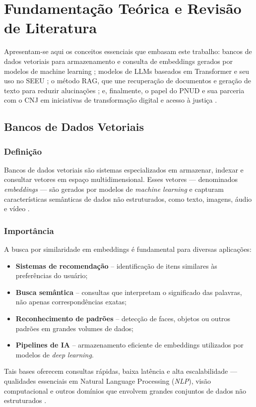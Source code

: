 

\chapter{Fundamentação Teórica e Revisão de Literatura}
\label{chap:fundamentacao_literatura}

Apresentam-se aqui os conceitos essenciais que embasam este trabalho: bancos de dados vetoriais para armazenamento e consulta de embeddings gerados por modelos de machine learning \cite{qwak2024integrating}; modelos de LLMs baseados em Transformer e seu uso no SEEU \cite{lewis2020rag,gao2023survey}; o método RAG, que une recuperação de documentos e geração de texto para reduzir alucinações \cite{edwards2024hybrid}; e, finalmente, o papel do PNUD e sua parceria com o CNJ em iniciativas de transformação digital e acesso à justiça \cite{undp2025sobre,undp2025pnudcnj}.

\section{Bancos de Dados Vetoriais}
\label{sec:bancos-vetoriais}

\subsection{Definição}
Bancos de dados vetoriais são sistemas especializados em armazenar, indexar e
consultar vetores em espaço multidimensional. Esses vetores — denominados
\emph{embeddings} — são gerados por modelos de \emph{machine learning} e
capturam características semânticas de dados não estruturados, como texto,
imagens, áudio e vídeo \cite{qwak2024integrating}.

\subsection{Importância}
A busca por similaridade em embeddings é fundamental para diversas
aplicações:
\begin{itemize}
  \item \textbf{Sistemas de recomendação} – identificação de itens similares às preferências do usuário;
  \item \textbf{Busca semântica} – consultas que interpretam o significado das palavras, não apenas correspondências exatas;
  \item \textbf{Reconhecimento de padrões} – detecção de faces, objetos ou outros padrões em grandes volumes de dados;
  \item \textbf{Pipelines de IA} – armazenamento eficiente de embeddings utilizados por modelos de \emph{deep learning}.
\end{itemize}
Tais bases oferecem consultas rápidas, baixa latência e alta escalabilidade —
qualidades essenciais em Natural Language Processing (\emph{NLP}), visão computacional e outros domínios que
envolvem grandes conjuntos de dados não estruturados
\cite{qwak2024integrating}.

